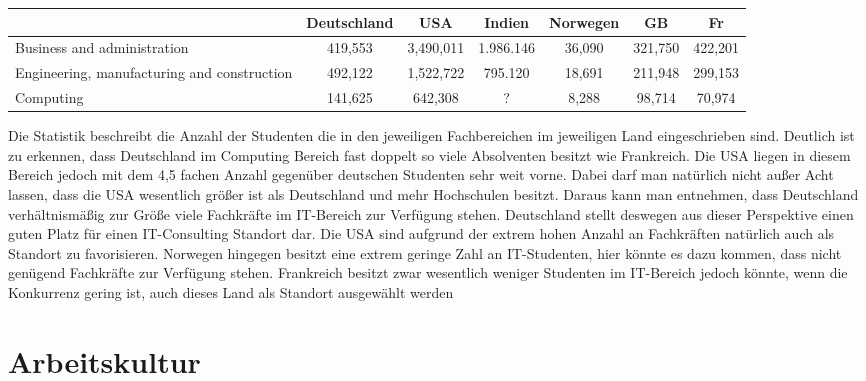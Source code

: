 \begin{table}[htp]
\begin{tabular}{|p{3cm}|c|c|c|c|c|c|}
\hline  	& Deutschland & USA & Indien  & Norwegen & GB & Fr \\ 
\hline  Business and administration & 419,553 & 3,490,011  & 1.986.146  & 36,090 & 321,750 & 422,201 \\ 
\hline  Engineering, manufacturing and construction & 492,122 & 1,522,722 & 795.120 & 18,691 & 211,948 & 299,153 \\ 
\hline  Computing &141,625  & 642,308 &? & 8,288 & 98,714 & 70,974\\ 
\hline 
\end{tabular} 
\end{table}
Die Statistik beschreibt die Anzahl der Studenten die in den jeweiligen Fachbereichen im jeweiligen Land eingeschrieben sind. Deutlich ist zu erkennen, dass Deutschland im Computing Bereich fast doppelt so viele Absolventen besitzt wie Frankreich. Die USA liegen in diesem Bereich jedoch mit dem 4,5 fachen Anzahl gegenüber deutschen Studenten sehr weit vorne. Dabei darf man natürlich nicht außer Acht lassen, dass die USA wesentlich größer ist als Deutschland und mehr Hochschulen besitzt.
Daraus kann man entnehmen, dass Deutschland verhältnismäßig zur Größe viele Fachkräfte im IT-Bereich zur Verfügung stehen. Deutschland stellt deswegen aus dieser Perspektive einen guten Platz für einen IT-Consulting Standort dar. Die USA sind aufgrund der extrem hohen Anzahl an Fachkräften natürlich auch als Standort zu favorisieren. Norwegen hingegen besitzt eine extrem geringe Zahl an IT-Studenten, hier könnte es dazu kommen, dass nicht genügend Fachkräfte zur Verfügung stehen. Frankreich besitzt zwar wesentlich weniger Studenten im IT-Bereich jedoch könnte, wenn die Konkurrenz gering ist, auch dieses Land als Standort ausgewählt werden 

\chapter{Arbeitskultur}






